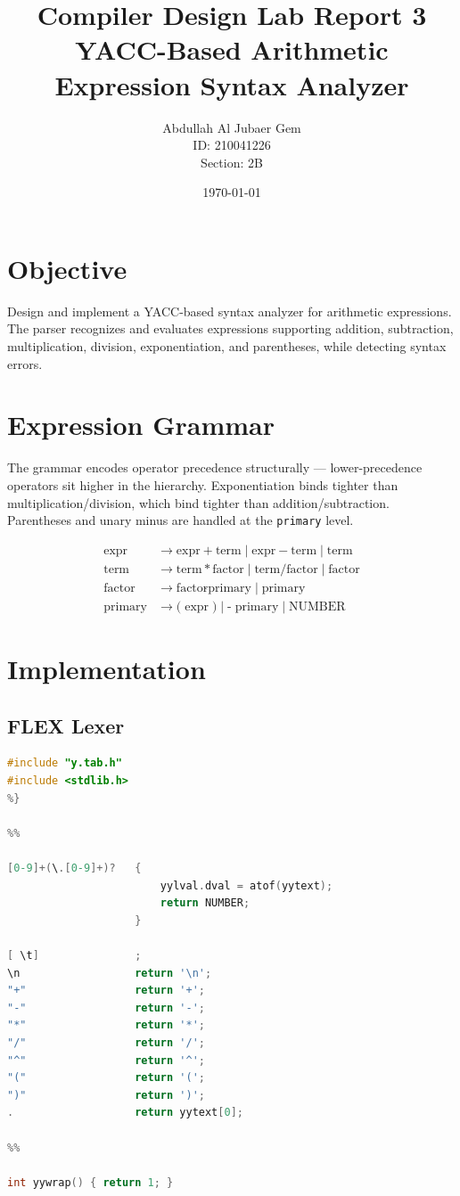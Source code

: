 \documentclass{article}
\title{Compiler Design Lab Report 3\\YACC-Based Arithmetic Expression Syntax Analyzer}
\author{Abdullah Al Jubaer Gem\\ID: 210041226\\Section: 2B}
\date{\today}
\begin{document}
\maketitle

\section{Objective}
Design and implement a YACC-based syntax analyzer for arithmetic expressions. The parser recognizes and evaluates expressions supporting addition, subtraction, multiplication, division, exponentiation, and parentheses, while detecting syntax errors.

\section{Expression Grammar}
The grammar encodes operator precedence structurally — lower-precedence operators sit higher in the hierarchy. Exponentiation binds tighter than multiplication/division, which bind tighter than addition/subtraction. Parentheses and unary minus are handled at the \texttt{primary} level.

\begin{align*}
\text{expr}    &\rightarrow \text{expr} + \text{term} \mid \text{expr} - \text{term} \mid \text{term} \\
\text{term}    &\rightarrow \text{term} * \text{factor} \mid \text{term} / \text{factor} \mid \text{factor} \\
\text{factor}  &\rightarrow \text{factor} \mathbin{\hat{}} \text{primary} \mid \text{primary} \\
\text{primary} &\rightarrow \texttt{(}\;\text{expr}\;\texttt{)} \mid \texttt{-}\;\text{primary} \mid \text{NUMBER}
\end{align*}

\section{Implementation}

\subsection{FLEX Lexer}

\begin{lstlisting}[language=C, caption=FLEX Lexer]
%{
#include "y.tab.h"
#include <stdlib.h>
%}

%%

[0-9]+(\.[0-9]+)?   {
                        yylval.dval = atof(yytext);
                        return NUMBER;
                    }

[ \t]               ;
\n                  return '\n';
"+"                 return '+';
"-"                 return '-';
"*"                 return '*';
"/"                 return '/';
"^"                 return '^';
"("                 return '(';
")"                 return ')';
.                   return yytext[0];

%%

int yywrap() { return 1; }
\end{lstlisting}
\end{document}
